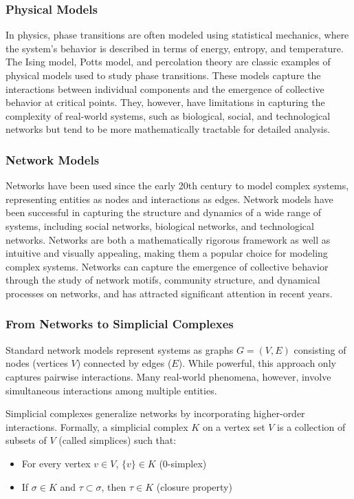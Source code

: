 \subsubsection{Physical Models}

In physics, phase transitions are often modeled using statistical mechanics, where the system's behavior is described in terms of energy, entropy, and temperature. The Ising model, Potts model, and percolation theory are classic examples of physical models used to study phase transitions. These models capture the interactions between individual components and the emergence of collective behavior at critical points. They, however, have limitations in capturing the complexity of real-world systems, such as biological, social, and technological networks but tend to be more mathematically tractable for detailed analysis.

\subsubsection{Network Models}

Networks have been used since the early 20th century to model complex systems, representing entities as nodes and interactions as edges. Network models have been successful in capturing the structure and dynamics of a wide range of systems, including social networks, biological networks, and technological networks. Networks are both a mathematically rigorous framework as well as intuitive and visually appealing, making them a popular choice for modeling complex systems. Networks can capture the emergence of collective behavior through the study of network motifs, community structure, and dynamical processes on networks, and has attracted significant attention in recent years.

\subsubsection{From Networks to Simplicial Complexes}
Standard network models represent systems as graphs $G = (V, E)$ consisting of nodes (vertices $V$) connected by edges ($E$). While powerful, this approach only captures pairwise interactions. Many real-world phenomena, however, involve simultaneous interactions among multiple entities.

Simplicial complexes generalize networks by incorporating higher-order interactions. Formally, a simplicial complex $K$ on a vertex set $V$ is a collection of subsets of $V$ (called simplices) such that:
\begin{itemize}
    \item For every vertex $v \in V$, $\{v\} \in K$ (0-simplex)
    \item If $\sigma \in K$ and $\tau \subset \sigma$, then $\tau \in K$ (closure property)
\end{itemize}

